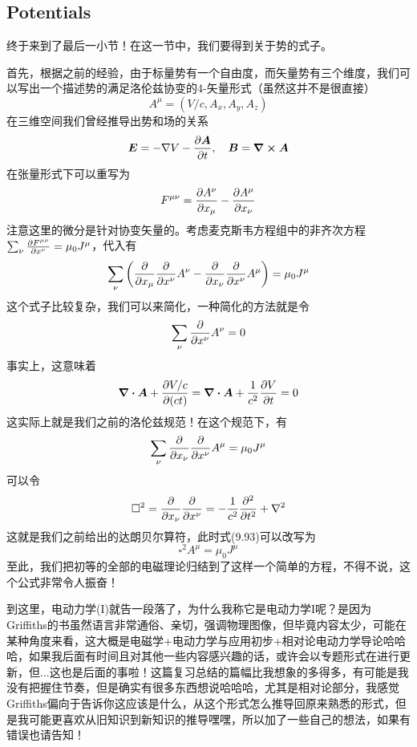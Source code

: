 \documentclass[14pt,oneside]{book}
\def \E{\vb*{E}}
\def \B{\vb*{B}}
\def \A{\vb*{A}}
\begin{document}
\begin{large}
\subsection{Potentials}
终于来到了最后一小节！在这一节中，我们要得到关于势的式子。

首先，根据之前的经验，由于标量势有一个自由度，而矢量势有三个维度，我们可以写出一个描述势的满足洛伦兹协变的4-矢量形式（虽然这并不是很直接）
\begin{equation}
  A^\mu=(V/c,A_x,A_y,A_z)
\end{equation}
在三维空间我们曾经推导出势和场的关系
\begin{equation}
  \E=-\nabla V-\pdv{\A}{t},\quad \B=\curl\A
\end{equation}
在张量形式下可以重写为
\begin{equation}
  F^{\mu\nu}=\pdv{A^\nu}{x_\mu}-\pdv{A^\mu}{x_\nu}
\end{equation}
注意这里的微分是针对协变矢量的。考虑麦克斯韦方程组中的非齐次方程$\sum_\nu \pdv{F^{\mu \nu}}{x^\nu}=\mu_0 J^\mu$，代入有
\begin{equation}
  \sum_\nu \left(\pdv{}{x_\mu}\pdv{}{x^\nu}A^\nu-\pdv{}{x_\nu}\pdv{}{x^\nu}A^\mu\right)=\mu_0 J^\mu
\end{equation}
这个式子比较复杂，我们可以来简化，一种简化的方法就是令
\begin{equation}
  \sum_\nu \pdv{}{x^\nu}A^\nu=0
\end{equation}
事实上，这意味着
\begin{equation}
  \div{\vb*{A}}+\pdv{V/c}{(ct)}=\div{\A}+\frac{1}{c^2}\pdv{V}{t}=0
\end{equation}
这实际上就是我们之前的洛伦兹规范！在这个规范下，有
\begin{equation}
  \sum_\nu \pdv{}{x_\nu}\pdv{}{x^\nu}A^\mu=\mu_0 J^\mu
\end{equation}
可以令
\begin{equation}
 \square^2=\pdv{}{x_\nu}\pdv{}{x^\nu}=-\frac{1}{c^2}\pdv[2]{}{t}+\nabla^2
\end{equation}
这就是我们之前给出的达朗贝尔算符，此时式(9.93)可以改写为
\begin{equation}
  \square^2 A^\mu=\mu_0 J^\mu
\end{equation}
至此，我们把初等的全部的电磁理论归结到了这样一个简单的方程，不得不说，这个公式非常令人振奋！

到这里，电动力学(I)就告一段落了，为什么我称它是电动力学I呢？是因为Griffiths的书虽然语言非常通俗、亲切，强调物理图像，但毕竟内容太少，可能在某种角度来看，这大概是电磁学+电动力学与应用初步+相对论电动力学导论哈哈哈，如果我后面有时间且对其他一些内容感兴趣的话，或许会以专题形式在进行更新，但...这也是后面的事啦！这篇复习总结的篇幅比我想象的多得多，有可能是我没有把握住节奏，但是确实有很多东西想说哈哈哈，尤其是相对论部分，我感觉Griffiths偏向于告诉你这应该是什么，从这个形式怎么推导回原来熟悉的形式，但是我可能更喜欢从旧知识到新知识的推导嘿嘿，所以加了一些自己的想法，如果有错误也请告知！


\end{large}
\end{document}
